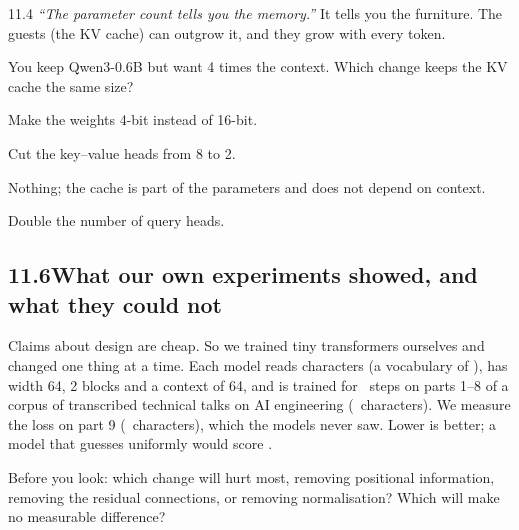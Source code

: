 \begin{wrongidea}{11.4}
\emph{``The parameter count tells you the memory.''} It tells you the furniture. The guests (the KV
cache) can outgrow it, and they grow with every token.
\end{wrongidea}

\begin{checkq}
You keep Qwen3-0.6B but want 4 times the context. Which change keeps the KV cache the same size?
\begin{options}
\item Make the weights 4-bit instead of 16-bit.
\item Cut the key--value heads from 8 to 2.
\item Nothing; the cache is part of the parameters and does not depend on context.
\item Double the number of query heads.
\end{options}
\end{checkq}


\subsection*{11.6\quad What our own experiments showed, and what they could not}

Claims about design are cheap. So we trained tiny transformers ourselves and changed one thing at a time.
Each model reads characters (a vocabulary of \nElevenVocab), has width 64, 2 blocks and a context of 64,
and is trained for \nElevenSteps\ steps on parts 1--8 of a corpus of transcribed technical talks on AI
engineering (\nElevenTrainChars\ characters). We measure the loss on part 9 (\nElevenValChars\ characters),
which the models never saw. Lower is
better; a model that guesses uniformly would score \nElevenUniform.

\Predict Before you look: which change will hurt most, removing positional information, removing the
residual connections, or removing normalisation? Which will make no measurable difference?

